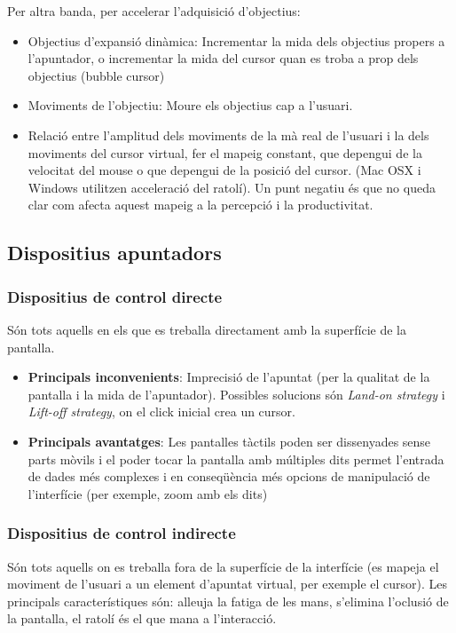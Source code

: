 \documentclass[12pt]{article}
\begin{document}
    \hfill \break
    Per altra banda, per accelerar l'adquisició d'objectius:

    \begin{itemize}
        \item Objectius d'expansió dinàmica: Incrementar la mida dels objectius propers a l'apuntador, o incrementar la mida del cursor
        quan es troba a prop dels objectius (bubble cursor)
        \item Moviments de l'objectiu: Moure els objectius cap a l'usuari.
        \item Relació entre l'amplitud dels moviments de la mà real de l'usuari i la dels moviments del cursor virtual, fer el mapeig constant, 
        que depengui de la velocitat del mouse o que depengui de la posició del cursor. (Mac OSX i Windows utilitzen acceleració del ratolí). Un punt 
        negatiu és que no queda clar com afecta aquest mapeig a la percepció i la productivitat.
    \end{itemize}

    \subsection{Dispositius apuntadors}
        \subsubsection{Dispositius de control directe}
        Són tots aquells en els que es treballa directament amb la superfície de la pantalla.
        \begin{itemize}
            \item \textbf{Principals inconvenients}: Imprecisió de l'apuntat (per la qualitat de la pantalla i la mida de l'apuntador). Possibles solucions són 
            \textit{Land-on strategy} i \textit{Lift-off strategy}, on el click inicial crea un cursor.
            \item \textbf{Principals avantatges}: Les pantalles tàctils poden ser dissenyades sense parts mòvils i el poder tocar la pantalla amb múltiples dits permet
            l'entrada de dades més complexes i en conseqüència més opcions de manipulació de l'interfície (per exemple, zoom amb els dits)

        \end{itemize}
    
        \subsubsection{Dispositius de control indirecte}
        Són tots aquells on es treballa fora de la superfície de la interfície (es mapeja el moviment de l'usuari a un element d'apuntat virtual, per exemple el cursor).
        Les principals característiques són: alleuja la fatiga de les mans, s'elimina l'oclusió de la pantalla, el ratolí és el que mana a l'interacció.
\end{document}

